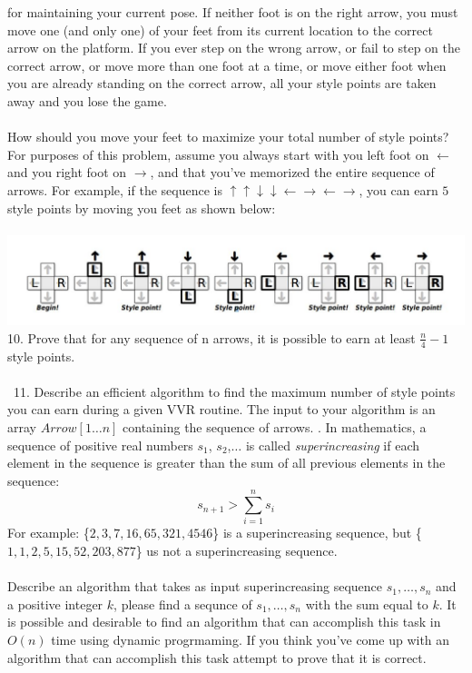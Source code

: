 \documentclass[12pt]{article}
\newcommand\blankpage{%
    \null
    \thispagestyle{empty}%
    \addtocounter{page}{-1}%
    \newpage}
\begin{document}
for maintaining your current pose. If neither foot is on the right arrow, you must move one
(and only one) of your feet from its current location to the correct arrow on the platform.
If you ever step on the wrong arrow, or fail to step on the correct arrow, or move more
than one foot at a time, or move either foot when you are already standing on the correct
arrow, all your style points are taken away and you lose the game.\\\\
How should you move your feet to maximize your total number of style points? For
purposes of this problem, assume you always start with you left foot on $\leftarrow$
and you right
foot on $\rightarrow$, and that you’ve memorized the entire sequence of arrows. For example, if the
sequence is $\uparrow\uparrow\downarrow\downarrow\leftarrow\rightarrow\leftarrow\rightarrow$, you can earn $5$ style points by moving you feet as shown
below:\\\\
\includegraphics[width=\textwidth]{ddr.jpg}\\
10. Prove that for any sequence of n arrows, it is possible to earn at least $\frac{n}{4} - 1$ style
points.\\\\\
11. Describe an efficient algorithm to find the maximum number of style points you can
earn during a given VVR routine. The input to your algorithm is an array $Arrow[1 \dots n]$
containing the sequence of arrows.
\afterpage{\blankpage}
\newpage
{}. In mathematics, a sequence of positive real numbers 
$s_1$, $s_2$,$\dots$ is called \textit{superincreasing} if each element
in the sequence is greater than the sum of all previous elements in the sequence:
$$s_{n+1} > \sum\limits_{i=1}^{n}s_i$$
For example: \{$2,3,7,16,65,321,4546$\} is a superincreasing sequence, 
but \{$1,1,2,5,15,52,203,877$\} us not a superincreasing sequence.\\\\
Describe an algorithm that takes as input superincreasing sequence $s_1,\dots,s_n$ and a positive 
integer $k$, please find a sequnce of $s_1,\dots,s_n$ with the sum equal
to $k$. It is possible and desirable to find an algorithm that can accomplish this
task in $O(n)$ time using dynamic progrmaming. If you think you've come up with an
algorithm that can accomplish this task attempt to prove that it is correct.
\newpage
\end{document}
